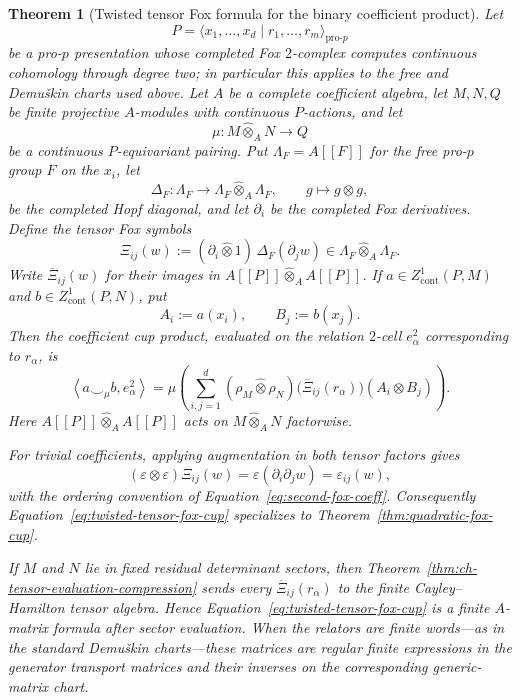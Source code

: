 \documentclass[11pt]{article}
\newtheorem{theorem}{Theorem}[section]
\theoremstyle{definition}
\begin{document}
\begin{theorem}[Twisted tensor Fox formula for the binary coefficient product]\label{thm:twisted-tensor-fox-cup}
Let
\[
 P=\langle x_1,\ldots,x_d\mid r_1,\ldots,r_m\rangle_{\mathrm{pro}\text{-}p}
\]
be a pro-$p$ presentation whose completed Fox $2$-complex computes continuous
cohomology through degree two; in particular this applies to the free and
Demu\v{s}kin charts used above.  Let $A$ be a complete coefficient algebra,
let $M,N,Q$ be finite projective $A$-modules with continuous $P$-actions, and
let
\[
 \mu:M\widehat\otimes_A N\longrightarrow Q
\]
be a continuous $P$-equivariant pairing.  Put $\Lambda_F=A[[F]]$ for the free
pro-$p$ group $F$ on the $x_i$, let
\[
 \Delta_F:\Lambda_F\longrightarrow
 \Lambda_F\widehat\otimes_A\Lambda_F,
 \qquad g\longmapsto g\otimes g,
\]
be the completed Hopf diagonal, and let $\partial_i$ be the completed Fox
derivatives.  Define the tensor Fox symbols
\begin{equation}\label{eq:tensor-fox-symbol}
 \Xi_{ij}(w)
 :=
 (\partial_i\widehat\otimes 1)\,\Delta_F(\partial_j w)
 \in
 \Lambda_F\widehat\otimes_A\Lambda_F.
\end{equation}
Write $\overline{\Xi}_{ij}(w)$ for their images in
$A[[P]]\widehat\otimes_A A[[P]]$.  If
$a\in Z^1_{\mathrm{cont}}(P,M)$ and
$b\in Z^1_{\mathrm{cont}}(P,N)$, put
\[
 A_i:=a(x_i),\qquad B_j:=b(x_j).
\]
Then the coefficient cup product, evaluated on the relation $2$-cell
$e^2_\alpha$ corresponding to $r_\alpha$, is
\begin{equation}\label{eq:twisted-tensor-fox-cup}
 \left\langle a\smile_\mu b,e^2_\alpha\right\rangle
 =
 \mu\!\left(
 \sum_{i,j=1}^{d}
 (\rho_M\widehat\otimes\rho_N)
 \bigl(\overline{\Xi}_{ij}(r_\alpha)\bigr)
 (A_i\otimes B_j)
 \right).
\end{equation}
Here $A[[P]]\widehat\otimes_AA[[P]]$ acts on
$M\widehat\otimes_A N$ factorwise.

For trivial coefficients, applying augmentation in both tensor factors gives
\begin{equation}\label{eq:tensor-fox-augmentation}
 (\varepsilon\otimes\varepsilon)\Xi_{ij}(w)
 =\varepsilon(\partial_i\partial_j w)
 =\varepsilon_{ij}(w),
\end{equation}
with the ordering convention of Equation~\eqref{eq:second-fox-coeff}.
Consequently Equation~\eqref{eq:twisted-tensor-fox-cup} specializes to
Theorem~\ref{thm:quadratic-fox-cup}.

If $M$ and $N$ lie in fixed residual determinant sectors, then
Theorem~\ref{thm:ch-tensor-evaluation-compression} sends every
$\overline{\Xi}_{ij}(r_\alpha)$ to the finite Cayley--Hamilton tensor algebra.
Hence Equation~\eqref{eq:twisted-tensor-fox-cup} is a finite $A$-matrix formula
after sector evaluation.  When the relators are finite words---as in the
standard Demu\v{s}kin charts---these matrices are regular finite expressions
in the generator transport matrices and their inverses on the corresponding
generic-matrix chart.
\end{theorem}
\end{document}
